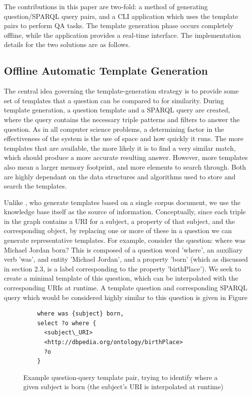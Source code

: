 \documentclass[sigplan,screen]{acmart}
\begin{document}
The contributions in this paper are two-fold: a method of generating question/SPARQL query pairs, and a CLI application which uses the template pairs to perform QA tasks. The template generation phase occurs completely offline, while the application provides a real-time interface. The implementation details for the two solutions are as follows.

\subsection{Offline Automatic Template Generation}

The central idea governing the template-generation strategy is to provide some set of templates that a question can be compared to for similarity. During template generation, a question template and a SPARQL query are created, where the query contains the necessary triple patterns and filters to answer the question. As in all computer science problems, a determining factor in the effectiveness of the system is the use of space and how quickly it runs. The more templates that are available, the more likely it is to find a very similar match, which should produce a more accurate resulting answer. However, more templates also mean a larger memory footprint, and more elements to search through. Both are highly dependant on the data structures and algorithms used to store and search the templates.

Unlike \citeauthor{zheng-question-over-knowledge-graph}, who generate templates based on a single corpus document, we use the knowledge base itself as the source of information. Conceptually, since each triple in the graph contains a URI for a subject, a property of that subject, and the corresponding object, by replacing one or more of these in a question we can generate representative templates. For example, consider the question: where was Michael Jordan born? This is composed of a question word 'where', an auxiliary verb 'was', and entity 'Michael Jordan', and a property 'born' (which as discussed in section 2.3, is a label corresponding to the property 'birthPlace'). We seek to create a minimal template of this question, which can be interpolated with the corresponding URIs at runtime. A template question and corresponding SPARQL query which would be considered highly similar to this question is given in Figure

\begin{figure}
\begin{verbatim}
    where was {subject} born,
    select ?o where {
      <subject\_URI>
      <http://dbpedia.org/ontology/birthPlace>
      ?o
    }
\end{verbatim}
\caption{Example question-query template pair, trying to identify where a given subject is born (the subject's URI is interpolated at runtime)}
\label{figure:question-query-pair}
\end{figure}
\end{document}
